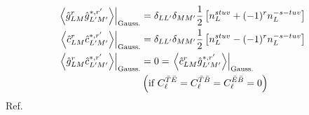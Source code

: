 \documentclass{article}
\newcommand{\av}[1]{\left\langle #1 \right\rangle}
\begin{document}
\begin{equation}
\begin{split}
\left.\av{\hat g^{r}_{LM} \hat g^{*, r'}_{L' M'} }\right|_{\rm Gauss.} &=\delta_{LL'}\delta_{MM'} \frac 12 \left[n_L^{stuv} +  (-1)^{r} n^{-s-tuv}_L\right] \\
		\left.\av{\hat c^{r}_{LM} \hat c^{*, r'}_{L' M'} }\right|_{\rm Gauss.} &= \delta_{LL'}\delta_{MM'}\frac 12 \left[n_L^{stuv} -  (-1)^{r} n^{-s-tuv}_L\right] \\
	\left.\av{\hat g^{r}_{LM} \hat c^{*, r'}_{L' M'} }\right|_{\rm Gauss.} &= 0 = \left.\av{\hat c^{r}_{LM} \hat g^{*, r'}_{L' M'} }\right|_{\rm Gauss.} \\
	&\left(\textrm{if   } C_\ell^{\bar T \bar E} = C_\ell^{\bar T \bar B} =  C_\ell^{\bar E \bar B} = 0\right)
\end{split}
\end{equation}
Ref.~\cite{Aghani}
\end{document}

